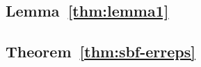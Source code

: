 \subsection*{Lemma~\ref{thm:lemma1}}
\label{sec:keyless-proof}


\subsection*{Theorem~\ref{thm:sbf-erreps}}
\label{sec:proof/sbf-erreps}


